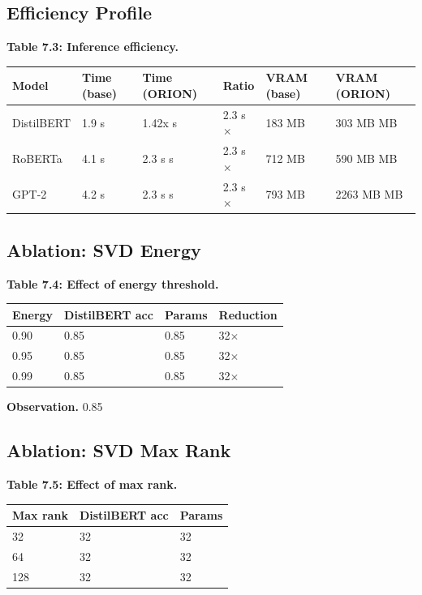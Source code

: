 \subsection{Efficiency Profile}

\textbf{Table 7.3: Inference efficiency.}

\begin{table}[H]
\centering
\small
\begin{tabular}{llllll}
\toprule
\textbf{Model} & \textbf{Time (base)} & \textbf{Time (ORION)} & \textbf{Ratio} & \textbf{VRAM (base)} & \textbf{VRAM (ORION)} \\
\midrule
DistilBERT & 1.9 s & 1.42x s & 2.3 s$\times$ & 183 MB & 303 MB MB \\
RoBERTa & 4.1 s & 2.3 s s & 2.3 s$\times$ & 712 MB & 590 MB MB \\
GPT-2 & 4.2 s & 2.3 s s & 2.3 s$\times$ & 793 MB & 2263 MB MB \\
\bottomrule
\end{tabular}
\end{table}

\subsection{Ablation: SVD Energy}

\textbf{Table 7.4: Effect of energy threshold.}

\begin{table}[H]
\centering
\small
\begin{tabular}{llll}
\toprule
\textbf{Energy} & \textbf{DistilBERT acc} & \textbf{Params} & \textbf{Reduction} \\
\midrule
0.90 & 0.85 & 0.85 & 32$\times$ \\
0.95 & 0.85 & 0.85 & 32$\times$ \\
0.99 & 0.85 & 0.85 & 32$\times$ \\
\bottomrule
\end{tabular}
\end{table}

\textbf{Observation.} 0.85

\subsection{Ablation: SVD Max Rank}

\textbf{Table 7.5: Effect of max rank.}

\begin{table}[H]
\centering
\small
\begin{tabular}{lll}
\toprule
\textbf{Max rank} & \textbf{DistilBERT acc} & \textbf{Params} \\
\midrule
32 & 32 & 32 \\
64 & 32 & 32 \\
128 & 32 & 32 \\
\bottomrule
\end{tabular}
\end{table}


